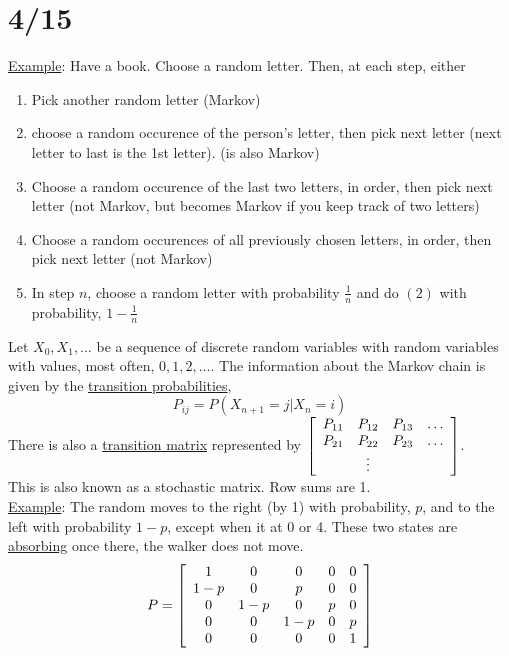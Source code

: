 \section*{4/15}
  \underline{Example}:
    Have a book. Choose a random letter. Then, at each step, either
    \begin{enumerate}
      \item Pick another random letter (Markov)
      \item choose a random occurence of the person's letter, then 
        pick next letter (next letter to last is the 1st letter).
        (is also Markov)
      \item Choose a random occurence of the last two letters, in 
        order, then pick next letter (not Markov, but becomes
        Markov if you keep track of two letters)
      \item Choose a random occurences of all previously chosen
        letters, in order, then pick next letter (not Markov)
      \item In step $n$, choose a random letter with probability
        $\frac{1}{n}$ and do $(2)$ with probability, $1 - 
        \frac{1}{n}$
    \end{enumerate}
    Let $X_0, X_1, \ldots$ be a sequence of discrete random 
    variables with random variables with values, most often, $0, 1, 
    2,\ldots$. The information about the Markov chain is given by
    the \underline{transition probabilities},
    $$
      P_{ij} = P(X_{n+1} = j | X_n = i)
    $$
    There is also a \underline{transition matrix} represented by
      $\left[
        \begin{array}{c c c c} 
          P_{11} & P_{12} & P_{13} & \ldots\\
          P_{21} & P_{22} & P_{23} & \ldots\\
          &\vdots & &\\
        \end{array}
      \right]$.\\
    This is also known as a stochastic matrix. Row sums are 1.\\

    \noindent\underline{Example}: The random moves to the right (by 1)
      with probability, $p$, and to the left with probability $1-p$,
      except when it at 0 or 4. These two states are \underline{absorbing}
      once there, the walker does not move.
      $$
        P = \left[
        \begin{array}{c c c c c} 
          1 & 0 & 0 & 0 & 0 \\
          1 - p & 0 & p & 0 & 0\\
          0 & 1 - p & 0 & p & 0\\
          0 & 0 & 1-p & 0 & p\\
          0 & 0 & 0 & 0 & 1
        \end{array}
      \right]
      $$

